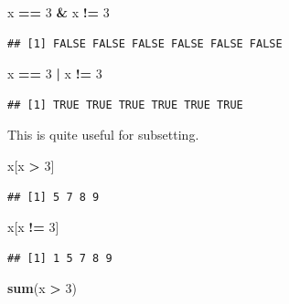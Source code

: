 \documentclass[]{book}
\newenvironment{Shaded}{\begin{snugshade}}{\end{snugshade}}
\newcommand{\KeywordTok}[1]{\textcolor[rgb]{0.13,0.29,0.53}{\textbf{#1}}}
\newcommand{\DecValTok}[1]{\textcolor[rgb]{0.00,0.00,0.81}{#1}}
\newcommand{\StringTok}[1]{\textcolor[rgb]{0.31,0.60,0.02}{#1}}
\newcommand{\OperatorTok}[1]{\textcolor[rgb]{0.81,0.36,0.00}{\textbf{#1}}}
\newcommand{\NormalTok}[1]{#1}
\begin{document}
\begin{Shaded}
\begin{Highlighting}[]
\NormalTok{x }\OperatorTok{==}\StringTok{ }\DecValTok{3} \OperatorTok{&}\StringTok{ }\NormalTok{x }\OperatorTok{!=}\StringTok{ }\DecValTok{3}
\end{Highlighting}
\end{Shaded}

\begin{verbatim}
## [1] FALSE FALSE FALSE FALSE FALSE FALSE
\end{verbatim}

\begin{Shaded}
\begin{Highlighting}[]
\NormalTok{x }\OperatorTok{==}\StringTok{ }\DecValTok{3} \OperatorTok{|}\StringTok{ }\NormalTok{x }\OperatorTok{!=}\StringTok{ }\DecValTok{3}
\end{Highlighting}
\end{Shaded}

\begin{verbatim}
## [1] TRUE TRUE TRUE TRUE TRUE TRUE
\end{verbatim}

This is quite useful for subsetting.

\begin{Shaded}
\begin{Highlighting}[]
\NormalTok{x[x }\OperatorTok{>}\StringTok{ }\DecValTok{3}\NormalTok{]}
\end{Highlighting}
\end{Shaded}

\begin{verbatim}
## [1] 5 7 8 9
\end{verbatim}

\begin{Shaded}
\begin{Highlighting}[]
\NormalTok{x[x }\OperatorTok{!=}\StringTok{ }\DecValTok{3}\NormalTok{]}
\end{Highlighting}
\end{Shaded}

\begin{verbatim}
## [1] 1 5 7 8 9
\end{verbatim}

\begin{Shaded}
\begin{Highlighting}[]
\KeywordTok{sum}\NormalTok{(x }\OperatorTok{>}\StringTok{ }\DecValTok{3}\NormalTok{)}
\end{Highlighting}
\end{Shaded}
\end{document}
